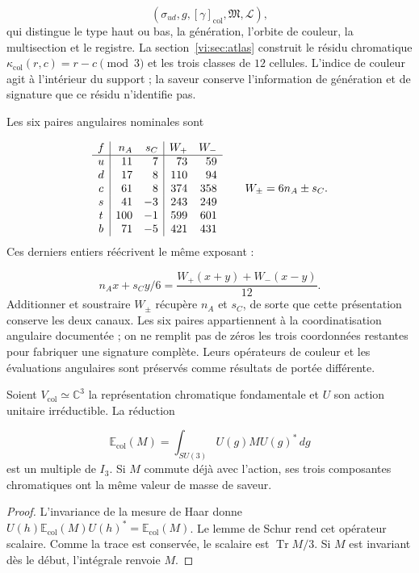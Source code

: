 \[
 (\sigma_{ud},g,[\gamma]_{\mathrm{col}},\mathfrak M,\mathscr L),
\]
qui distingue le type haut ou bas, la génération, l’orbite de couleur,
la multisection et le registre. La section~\ref{vi:sec:atlas} construit le
résidu chromatique \(\kappa_{\mathrm{col}}(r,c)=r-c\pmod3\) et les
trois classes de \(12\) cellules. L’indice de couleur agit à l’intérieur du
support ; la saveur conserve l’information de génération et de signature que ce
résidu n’identifie pas.


Les six paires angulaires nominales sont

\[
\begin{array}{c|r r|r r}
 f&n_A&s_C&W_+&W_-\\\hline
 u&11&7&73&59\\
 d&17&8&110&94\\
 c&61&8&374&358\\
 s&41&-3&243&249\\
 t&100&-1&599&601\\
 b&71&-5&421&431
\end{array}
\qquad W_\pm=6n_A\pm s_C.
\]
Ces derniers entiers réécrivent le même exposant :

\[
 n_Ax+s_Cy/6
 =\frac{W_+(x+y)+W_-(x-y)}{12}.
\]
Additionner et soustraire \(W_\pm\) récupère \(n_A\) et \(s_C\), de sorte que
cette présentation conserve les deux canaux. Les six paires appartiennent
à la coordinatisation angulaire documentée ; on ne remplit pas de zéros les trois
coordonnées restantes pour fabriquer une signature complète. Leurs opérateurs
de couleur et les évaluations angulaires sont préservés comme résultats de
portée différente.


\begin{proposition}
\label{vi:prop:masa-color}
Soient \(V_{\mathrm{col}}\simeq\mathbb C^3\) la représentation chromatique
fondamentale et \(U\) son action unitaire irréductible. La réduction

\[
 \mathbb E_{\mathrm{col}}(M)=
 \int_{SU(3)}U(g)MU(g)^*\,dg
\]
est un multiple de \(I_3\). Si \(M\) commute déjà avec l’action, ses trois
composantes chromatiques ont la même valeur de masse de saveur.

\end{proposition}
\begin{proof}
L’invariance de la mesure de Haar donne
\(U(h)\mathbb E_{\mathrm{col}}(M)U(h)^*=
\mathbb E_{\mathrm{col}}(M)\). Le lemme de Schur rend cet
opérateur scalaire. Comme la trace est conservée, le scalaire est
\(\operatorname{Tr}M/3\). Si \(M\) est invariant dès le début,
l’intégrale renvoie \(M\).

\end{proof}

